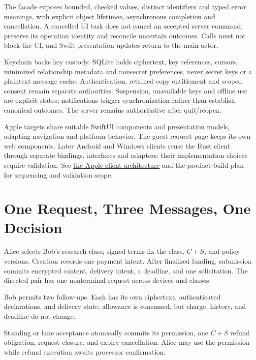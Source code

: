 \documentclass[11pt]{article}
\begin{document}
The facade exposes bounded, checked values, distinct identifiers and typed error
meanings, with explicit object lifetimes, asynchronous completion and cancellation.
A cancelled UI task does not cancel an accepted server command; preserve its
operation identity and reconcile uncertain outcomes. Calls must not block the UI,
and Swift presentation updates return to the main actor.

Keychain backs key custody. SQLite holds ciphertext, key references, cursors,
minimized relationship metadata and nonsecret preferences, never secret keys or
a plaintext message cache. Authentication, retained-copy entitlement and scoped
consent remain separate authorities. Suspension, unavailable keys and offline use
are explicit states; notifications trigger synchronization rather than establish
canonical outcomes. The server remains authoritative after quit/reopen.

Apple targets share suitable SwiftUI components and presentation models, adapting
navigation and platform behavior. The guest request page keeps its own web
components. Later Android and Windows clients reuse the Rust client through
separate bindings, interfaces and adapters; their implementation choices require
validation. See \href{docs/apple-client-architecture.md}{the Apple client
architecture} and the product build plan for sequencing and validation scope.

\section{One Request, Three Messages, One Decision}

Alice selects Bob's research class; signed terms fix the class, $C+S$, and policy
versions. Creation records one payment intent. After finalized funding, submission
commits encrypted content, delivery intent, a deadline, and one solicitation.
The directed pair has one nonterminal request across devices and classes.

Bob permits two follow-ups. Each has its own ciphertext, authenticated declarations,
and delivery state; allowance is consumed, but charge, history, and deadline do not change.

Standing or lane acceptance atomically commits its permission, one $C+S$ refund
obligation, request closure, and expiry cancellation. Alice may use the permission
while refund execution awaits processor confirmation.
\end{document}
